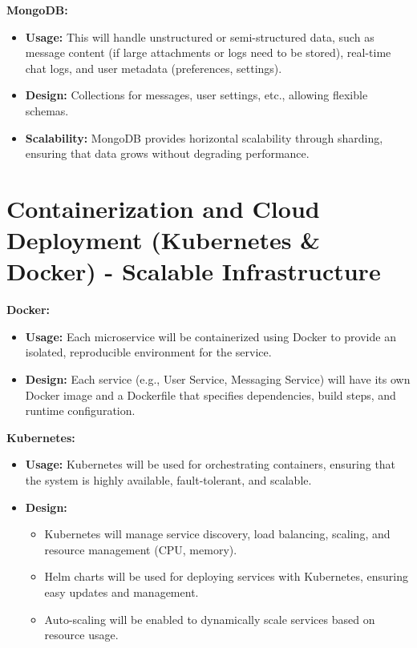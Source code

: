 \documentclass[12pt]{report}
\begin{document}
\textbf{MongoDB:}
\begin{itemize}
    \item \textbf{Usage:} This will handle unstructured or semi-structured data, such as message content (if large attachments or logs need to be stored), real-time chat logs, and user metadata (preferences, settings).
    \item \textbf{Design:} Collections for messages, user settings, etc., allowing flexible schemas.
    \item \textbf{Scalability:} MongoDB provides horizontal scalability through sharding, ensuring that data grows without degrading performance.
\end{itemize}

\section{Containerization and Cloud Deployment (Kubernetes \& Docker) - Scalable Infrastructure}

\textbf{Docker:}
\begin{itemize}
    \item \textbf{Usage:} Each microservice will be containerized using Docker to provide an isolated, reproducible environment for the service.
    \item \textbf{Design:} Each service (e.g., User Service, Messaging Service) will have its own Docker image and a Dockerfile that specifies dependencies, build steps, and runtime configuration.
\end{itemize}

\textbf{Kubernetes:}
\begin{itemize}
    \item \textbf{Usage:} Kubernetes will be used for orchestrating containers, ensuring that the system is highly available, fault-tolerant, and scalable.
    \item \textbf{Design:}
    \begin{itemize}
        \item Kubernetes will manage service discovery, load balancing, scaling, and resource management (CPU, memory).
        \item Helm charts will be used for deploying services with Kubernetes, ensuring easy updates and management.
        \item Auto-scaling will be enabled to dynamically scale services based on resource usage.
    \end{itemize}
\end{itemize}
 
\end{document}

